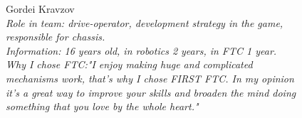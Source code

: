 \begin{figure}[H]
	\begin{minipage}{0.47\linewidth}
		Gordei Kravzov\\
		\emph{Role in team: drive-operator, development strategy in the game, responsible for chassis.\\ }
		\emph{Information: 16 years old, in robotics 2 years, in FTC 1 year. \\ } 
		\emph{Why I chose FTC:"I enjoy making huge and complicated mechanisms work, that's why I chose FIRST FTC. In my opinion it's a great way to improve your skills and broaden the mind doing something that you love by the whole heart."}		
	\end{minipage}
	\hfill
	\begin{minipage}[h]{0.47\linewidth}
		\\
	\end{minipage}
\end{figure}

